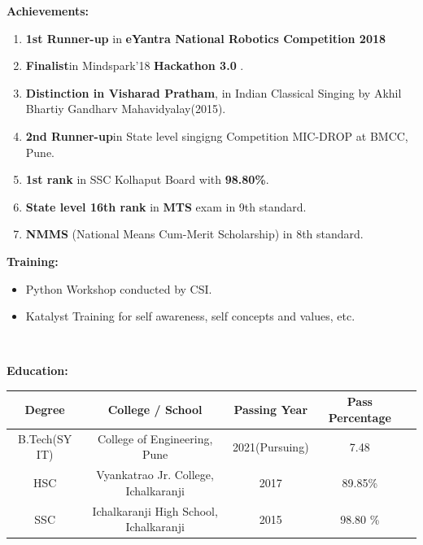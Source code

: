 \documentclass[a4paper,11pt]{article}
\begin{document}
\begin{minipage}[t]{0.5\textwidth}
			\raggedright\smallskip
			\begin{LARGE}
				\textbf{Achievements:}\medskip%
				{\small
					\begin{enumerate}
						\item \textbf{1st Runner-up} in \textbf{eYantra National Robotics Competition 2018}
						\item \textbf{Finalist}in Mindspark'18 \textbf{Hackathon 3.0} .
						\item \textbf{Distinction in Visharad Pratham}, in Indian Classical Singing by Akhil Bhartiy Gandharv Mahavidyalay(2015).
						\item \textbf{2nd Runner-up}in State level singigng Competition MIC-DROP at BMCC, Pune.
						\item \textbf{1st rank} in SSC Kolhaput Board with \textbf{98.80\%}.
						\item \textbf{State level 16th rank} in \textbf{MTS} exam in 9th standard.
						\item \textbf{NMMS} (National Means Cum-Merit Scholarship) in 8th standard.
					\end{enumerate}
				}
			\end{LARGE}
			\vspace{0.65cm}

\begin{Large}
				\textbf{Training:}\medskip%
				{\small
					\begin{itemize}
						\item {Python Workshop conducted by CSI.}
						\item {Katalyst Training for self awareness, self concepts and values, etc.}
					\end{itemize}
				}
			\end{Large}

			\
\end{minipage}%

\begin{Large}
	\textbf{Education:}\medskip%
\end{Large}

 \begin{large}
	\bigbreak
		\begin{tabular}{|c |c |c |c |c |}
			\hline
			Degree & College / School  & Passing Year & Pass Percentage \\
			\hline
			B.Tech(SY IT)& College of Engineering, Pune& 2021(\small {Pursuing}) & 7.48\\
			\hline
			HSC &Vyankatrao Jr. College, Ichalkaranji & 2017 & 89.85\% \\
			\hline
			SSC & Ichalkaranji High School, Ichalkaranji & 2015 & 98.80 \%\\
			\hline
	 	\end{tabular}
\end{large}
\vspace{0.5cm}
\end{document}
